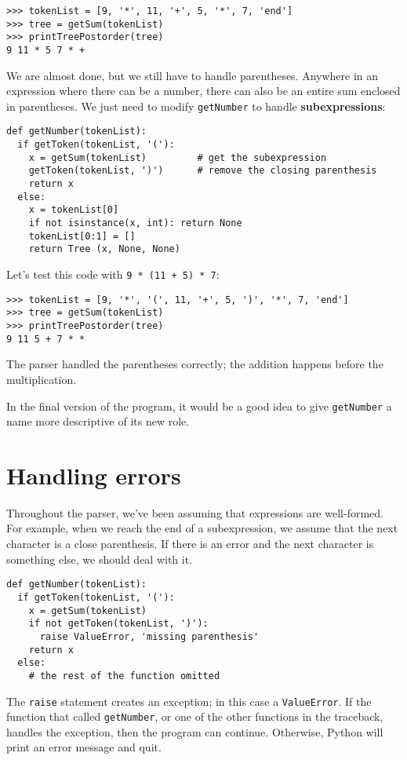 \beforeverb
\begin{verbatim}
>>> tokenList = [9, '*', 11, '+', 5, '*', 7, 'end']
>>> tree = getSum(tokenList)
>>> printTreePostorder(tree)
9 11 * 5 7 * +
\end{verbatim}
\afterverb
%
We are almost done, but we still have to handle parentheses.
Anywhere in an expression where there can be a number, there can
also be an entire sum
enclosed in parentheses.  We just need to modify {\tt getNumber} to
handle {\bf subexpressions}:


\beforeverb
\begin{verbatim}
def getNumber(tokenList):
  if getToken(tokenList, '('):
    x = getSum(tokenList)         # get the subexpression
    getToken(tokenList, ')')      # remove the closing parenthesis
    return x
  else:
    x = tokenList[0]
    if not isinstance(x, int): return None
    tokenList[0:1] = []
    return Tree (x, None, None)    
\end{verbatim}
\afterverb
%
Let's test this code with {\tt 9 * (11 + 5) * 7}:

\beforeverb
\begin{verbatim}
>>> tokenList = [9, '*', '(', 11, '+', 5, ')', '*', 7, 'end']
>>> tree = getSum(tokenList)
>>> printTreePostorder(tree)
9 11 5 + 7 * *
\end{verbatim}
\afterverb
%
\pagebreak

The parser handled the parentheses correctly; the addition happens
before the multiplication.

In the final version of the program, it would be a good idea
to give {\tt getNumber} a name
more descriptive of its new role.


\section{Handling errors}

Throughout the parser, we've been assuming that expressions are
well-formed.  For example, when we reach the end of a
subexpression, we assume that the next character is a close
parenthesis.  If there is an error and the next character is something
else, we should deal with it.

\beforeverb
\begin{verbatim}
def getNumber(tokenList):
  if getToken(tokenList, '('):
    x = getSum(tokenList)       
    if not getToken(tokenList, ')'):
      raise ValueError, 'missing parenthesis'
    return x
  else:
    # the rest of the function omitted
\end{verbatim}
\afterverb
%
The {\tt raise} statement creates an exception; in this
case a {\tt ValueError}.  If the function that called
{\tt getNumber}, or one of the other functions in the
traceback, handles the exception, then the program
can continue.  Otherwise, Python will print an error message
and quit.

